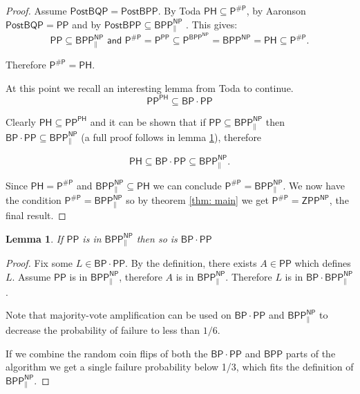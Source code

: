 \documentclass[10pt,a4paper]{article}
\newtheorem{lemma}[theorem]{Lemma}
\begin{document}
\begin{proof}
Assume $\mathsf{PostBQP=PostBPP}$. By Toda $\mathsf{PH\subseteq P^{\#P}}$, by Aaronson \cite{aaronson2005postBQP} $\mathsf{PostBQP=PP}$ and by $\mathsf{PostBPP \subseteq BPP^{NP}_{\parallel}}$ \cite{o2018weakness, han1997threshold}. This gives: 
\[
\mathsf{
PP \subseteq BPP^{NP}_{\parallel} \text{  and  }  P^{\#P} = P^{PP} \subseteq P^{BPP^{NP}} = BPP^{NP} = PH \subseteq P^{\#P}.
}
\]

Therefore $\mathsf{P^{\#P}=PH}$.

At this point we recall an interesting lemma from Toda \cite{toda1991pp} to continue.
\[\mathsf{
PP^{PH}\subseteq BP\cdot PP
}\]

Clearly $\mathsf{PH\subseteq PP^{PH}}$ and it can be shown that if $\mathsf{PP\subseteq BPP^{NP}_{\parallel}}$ then $\mathsf{BP \cdot PP \subseteq BPP^{NP}_{\parallel}}$ (a full proof follows in lemma \ref{lma: BP PP is in parallel too}), therefore

\[\mathsf{
PH\subseteq BP\cdot PP \subseteq BPP^{NP}_{\parallel}
}.\]

Since $\mathsf{PH = P^{\#P}}$ and $\mathsf{BPP^{NP}_{\parallel}\subseteq PH}$ we can conclude $\mathsf{P^{\#P}=BPP^{NP}_{\parallel}}$. We now have the condition $\mathsf{P^{\#P}= BPP^{NP}_{\parallel}}$ so by theorem \ref{thm: main} we get $\mathsf{P^{\#P} = ZPP^{NP}}$, the final result.
\end{proof}


\begin{lemma}\label{lma: BP PP is in parallel too}
    If $\mathsf{PP}$ is in $\mathsf{BPP^{NP}_{\parallel}}$ then so is $\mathsf{BP \cdot PP}$
\end{lemma}
\begin{proof}
Fix some $L\in \mathsf{BP\cdot PP}$. By the definition, there exists $A\in\mathsf{PP}$ which defines $L$.
Assume $\mathsf{PP}$ is in $\mathsf{BPP^{NP}_{\parallel}}$, therefore $A$ is in $\mathsf{BPP^{NP}_{\parallel}}$. Therefore $L$ is in $\mathsf{BP\cdot BPP^{NP}_{\parallel}}$.

Note that majority-vote amplification can be used on $\mathsf{BP\cdot PP}$ and $\mathsf{BPP^{NP}_{\parallel}}$ to decrease the probability of failure to less than $1/6$.

If we combine the random coin flips of both the $\mathsf{BP \cdot PP}$ and $\mathsf{BPP}$ parts of the algorithm we get a single failure probability below 1/3, which fits the definition of $\mathsf{BPP^{NP}_{\parallel}}$.
\end{proof}
\end{document}
